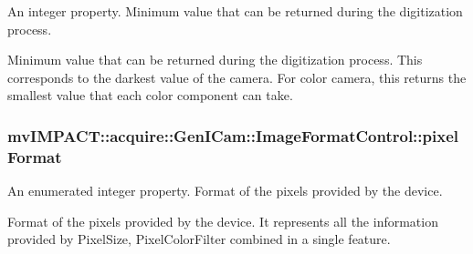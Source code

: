 An integer property. Minimum value that can be returned during the digitization process. 

Minimum value that can be returned during the digitization process. This corresponds to the darkest value of the camera. For color camera, this returns the smallest value that each color component can take. \hypertarget{classmv_i_m_p_a_c_t_1_1acquire_1_1_gen_i_cam_1_1_image_format_control_a7f91f3c763df04e2957c3435a76705aa}{
\subsubsection[{pixel\+Format}]{ mv\+I\+M\+P\+A\+C\+T\+::acquire\+::\+Gen\+I\+Cam\+::\+Image\+Format\+Control\+::pixel\+Format}}\label{classmv_i_m_p_a_c_t_1_1acquire_1_1_gen_i_cam_1_1_image_format_control_a7f91f3c763df04e2957c3435a76705aa}


An enumerated integer property. Format of the pixels provided by the device. 

Format of the pixels provided by the device. It represents all the information provided by Pixel\+Size, Pixel\+Color\+Filter combined in a single feature.

